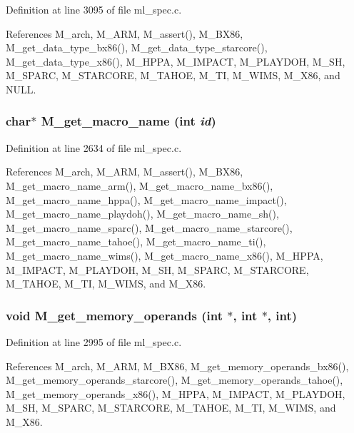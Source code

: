 Definition at line 3095 of file ml\_\-spec.c.

References M\_\-arch, M\_\-ARM, M\_\-assert(), M\_\-BX86, M\_\-get\_\-data\_\-type\_\-bx86(), M\_\-get\_\-data\_\-type\_\-starcore(), M\_\-get\_\-data\_\-type\_\-x86(), M\_\-HPPA, M\_\-IMPACT, M\_\-PLAYDOH, M\_\-SH, M\_\-SPARC, M\_\-STARCORE, M\_\-TAHOE, M\_\-TI, M\_\-WIMS, M\_\-X86, and NULL.
\subsubsection{\setlength{\rightskip}{0pt plus 5cm}char$\ast$ M\_\-get\_\-macro\_\-name (int {\em id})}\label{m__spec_8h_c91b78eb889c81a1d93c63a04086cb0f}




Definition at line 2634 of file ml\_\-spec.c.

References M\_\-arch, M\_\-ARM, M\_\-assert(), M\_\-BX86, M\_\-get\_\-macro\_\-name\_\-arm(), M\_\-get\_\-macro\_\-name\_\-bx86(), M\_\-get\_\-macro\_\-name\_\-hppa(), M\_\-get\_\-macro\_\-name\_\-impact(), M\_\-get\_\-macro\_\-name\_\-playdoh(), M\_\-get\_\-macro\_\-name\_\-sh(), M\_\-get\_\-macro\_\-name\_\-sparc(), M\_\-get\_\-macro\_\-name\_\-starcore(), M\_\-get\_\-macro\_\-name\_\-tahoe(), M\_\-get\_\-macro\_\-name\_\-ti(), M\_\-get\_\-macro\_\-name\_\-wims(), M\_\-get\_\-macro\_\-name\_\-x86(), M\_\-HPPA, M\_\-IMPACT, M\_\-PLAYDOH, M\_\-SH, M\_\-SPARC, M\_\-STARCORE, M\_\-TAHOE, M\_\-TI, M\_\-WIMS, and M\_\-X86.
\subsubsection{\setlength{\rightskip}{0pt plus 5cm}void M\_\-get\_\-memory\_\-operands (int $\ast$, int $\ast$, int)}\label{m__spec_8h_0d784a4680b9db109c3dcfb874e89207}




Definition at line 2995 of file ml\_\-spec.c.

References M\_\-arch, M\_\-ARM, M\_\-BX86, M\_\-get\_\-memory\_\-operands\_\-bx86(), M\_\-get\_\-memory\_\-operands\_\-starcore(), M\_\-get\_\-memory\_\-operands\_\-tahoe(), M\_\-get\_\-memory\_\-operands\_\-x86(), M\_\-HPPA, M\_\-IMPACT, M\_\-PLAYDOH, M\_\-SH, M\_\-SPARC, M\_\-STARCORE, M\_\-TAHOE, M\_\-TI, M\_\-WIMS, and M\_\-X86.
